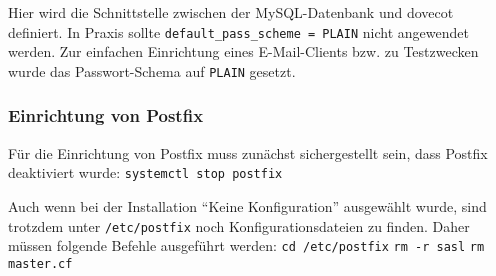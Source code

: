 Hier wird die Schnittstelle zwischen der MySQL-Datenbank und dovecot definiert. In Praxis sollte \verb|default_pass_scheme = PLAIN| nicht angewendet werden. Zur einfachen Einrichtung eines E-Mail-Clients bzw. zu Testzwecken wurde das Passwort-Schema auf \verb|PLAIN| gesetzt. 

\subsubsection{Einrichtung von Postfix}
Für die Einrichtung von Postfix muss zunächst sichergestellt sein, dass Postfix deaktiviert wurde:
\verb|systemctl stop postfix|\newline

Auch wenn bei der Installation ``Keine Konfiguration'' ausgewählt wurde, sind trotzdem unter \verb|/etc/postfix| noch Konfigurationsdateien zu finden. Daher müssen folgende Befehle ausgeführt werden:\newline
\verb|cd /etc/postfix|\newline
\verb|rm -r sasl|\newline
\verb|rm master.cf|\newline

